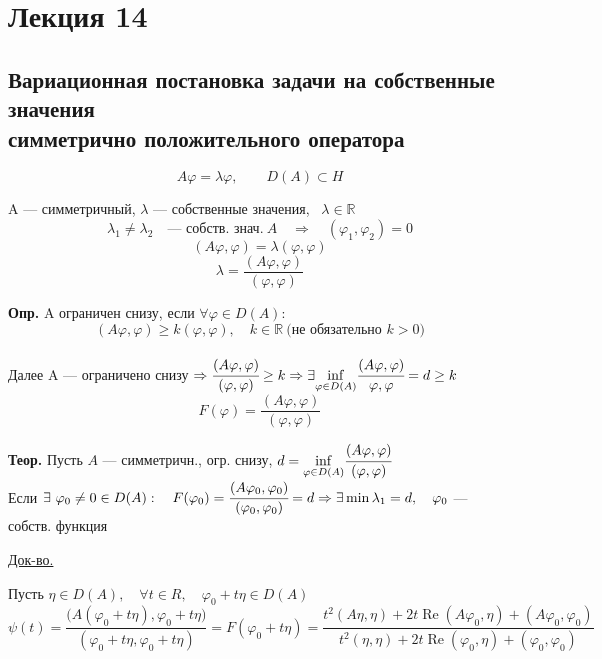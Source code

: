 \section{Лекция 14}

\subsection{Вариационная постановка задачи на собственные значения \\ симметрично положительного оператора}

\[ A \varphi = \lambda \varphi, \qquad D(A) \subset H \label{14.1} \tag{14.1} \]

A --- симметричный, \qquad $ \lambda $ --- собственные значения, \ $ \lambda \in \mathbb{R} $
\[ \lambda_1 \neq \lambda_2 \quad \text{--- собств. знач.} \ A \quad \Rightarrow \quad (\varphi_1, \varphi_2) = 0\]
\[ (A\varphi, \varphi) = \lambda (\varphi, \varphi) \]
\[ \lambda = \frac{(A\varphi, \varphi)}{(\varphi, \varphi)} \label{eq:14_2} \]

\textbf{Опр.} A ограничен снизу, если $ \forall \varphi \in D(A):$ \\
\[ (A\varphi, \varphi) \geq k(\varphi, \varphi), \quad k \in \mathbb{R} \ \text{(не обязательно $k>0$)} \label{14.2} \tag{14.2} \] \\

Далее A --- ограничено снизу $ \Rightarrow  \cfrac{(A \varphi, \varphi)}{(\varphi, \varphi)} \geq k \Rightarrow \exists \underset{\varphi \in D(A)}{\inf} \cfrac{(A\varphi, \varphi)}{\varphi, \varphi} = d \geq k$
\[ F(\varphi) = \frac{(A \varphi, \varphi)}{(\varphi, \varphi)} \label{14.4} \tag{14.4} \]

\textbf{Теор.} Пусть $ A $ --- симметричн., огр. снизу,  \quad $ d = \underset{\varphi \in D(A)}{\inf} \cfrac{(A \varphi, \varphi)}{(\varphi, \varphi)} $ \\
Если $ \exists \ \varphi_0 \neq 0 \in D(A): \quad F(\varphi_0) = \cfrac{(A \varphi_0, \varphi_0)}{(\varphi_0, \varphi_0)} = d \Rightarrow \exists \min \lambda_1 = d, \quad \varphi_0$ --- собств. функция

\underline{Док-во.}

Пусть $ \eta \in D(A), \quad \forall t \in R, \quad \varphi_0 + t \eta \in D(A) $
\[ \psi(t) = \frac{\bigl( A(\varphi_0 + t \eta), \varphi_0 + t\eta \bigr)}{(\varphi_0 + t \eta, \varphi_0 + t\eta)} = F(\varphi_0 + t \eta) = \frac{t^2(A \eta, \eta) + 2 t \operatorname{Re}(A \varphi_0, \eta) + (A \varphi_0, \varphi_0)}{t^2 (\eta, \eta) + 2t\operatorname{Re}(\varphi_0, \eta) + (\varphi_0, \varphi_0)} \]

